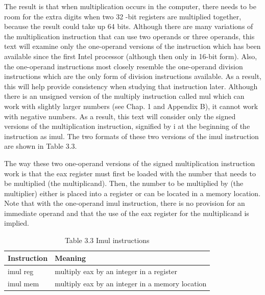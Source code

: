 \documentclass[10pt]{book}
\begin{document}
The result is that when multiplication occurs in the computer, there needs to be room for the extra digits when two 32 -bit registers are multiplied together, because the result could take up 64 bits. Although there are many variations of the multiplication instruction that can use two operands or three operands, this text will examine only the one-operand versions of the instruction which has been available since the first Intel processor (although then only in 16-bit form). Also, the one-operand instructions most closely resemble the one-operand division instructions which are the only form of division instructions available. As a result, this will help provide consistency when studying that instruction later. Although there is an unsigned version of the multiply instruction called mul which can work with slightly larger numbers (see Chap. 1 and Appendix B), it cannot work with negative numbers. As a result, this text will consider only the signed versions of the multiplication instruction, signified by i at the beginning of the instruction as imul. The two formats of these two versions of the imul instruction are shown in Table 3.3.

The way these two one-operand versions of the signed multiplication instruction work is that the eax register must first be loaded with the number that needs to be multiplied (the multiplicand). Then, the number to be multiplied by (the multiplier) either is placed into a register or can be located in a memory location. Note that with the one-operand imul instruction, there is no provision for an immediate operand and that the use of the eax register for the multiplicand is implied.

\begin{table}[htbp]
\begin{center}
\captionsetup{labelformat=empty}
\caption{Table 3.3 Imul instructions}
\begin{tabular}{|l|l|}
\hline
Instruction & Meaning \\
\hline
imul reg & multiply eax by an integer in a register \\
\hline
imul mem & multiply eax by an integer in a memory location \\
\hline
\end{tabular}
\end{center}
\end{table}
\end{document}
